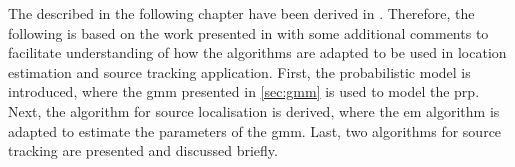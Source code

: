 The described in the following chapter have been derived in \cite{Schwartz2014}. Therefore, the following is based on the work presented in \cite{Schwartz2014} with some additional comments to facilitate understanding of how the algorithms are adapted to be used in location estimation and source tracking application. First, the probabilistic model is introduced, where the \gls{gmm} presented in \autoref{sec:gmm} is used to model the \gls{prp}. Next, the algorithm for source localisation is derived, where the \gls{em} algorithm is adapted to estimate the parameters of the \gls{gmm}. Last, two algorithms for source tracking are presented and discussed briefly.
